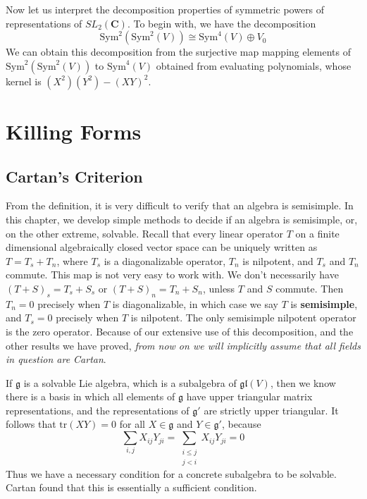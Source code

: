 Now let us interpret the decomposition properties of symmetric powers of representations of $SL_2(\mathbf{C})$. To begin with, we have the decomposition
%
\[ \text{Sym}^2(\text{Sym}^2(V)) \cong \text{Sym}^4(V) \oplus V_0 \]
%
We can obtain this decomposition from the surjective map mapping elements of $\text{Sym}^2(\text{Sym}^2(V))$ to $\text{Sym}^4(V)$ obtained from evaluating polynomials, whose kernel is $(X^2)(Y^2) - (XY)^2$.


\chapter{Killing Forms}

\section{Cartan's Criterion}

From the definition, it is very difficult to verify that an algebra is semisimple. In this chapter, we develop simple methods to decide if an algebra is semisimple, or, on the other extreme, solvable. Recall that every linear operator $T$ on a finite dimensional algebraically closed vector space can be uniquely written as $T = T_s + T_n$, where $T_s$ is a diagonalizable operator, $T_n$ is nilpotent, and $T_s$ and $T_n$ commute. This map is not very easy to work with. We don't necessarily have $(T + S)_s = T_s + S_s$ or $(T + S)_n = T_n + S_n$, unless $T$ and $S$ commute. Then $T_n = 0$ precisely when $T$ is diagonalizable, in which case we say $T$ is {\bf semisimple}, and $T_s = 0$ precisely when $T$ is nilpotent. The only semisimple nilpotent operator is the zero operator. Because of our extensive use of this decomposition, and the other results we have proved, {\it from now on we will implicitly assume that all fields in question are Cartan}.

If $\mathfrak{g}$ is a solvable Lie algebra, which is a subalgebra of $\mathfrak{gl}(V)$, then we know there is a basis in which all elements of $\mathfrak{g}$ have upper triangular matrix representations, and the representations of $\mathfrak{g}'$ are strictly upper triangular. It follows that $\text{tr}(XY) = 0$ for all $X \in \mathfrak{g}$ and $Y \in \mathfrak{g}'$, because
%
\[ \sum_{i,j} X_{ij}Y_{ji} = \sum_{\substack{i \leq j\\j < i}} X_{ij} Y_{ji} = 0 \]
%
Thus we have a necessary condition for a concrete subalgebra to be solvable. Cartan found that this is essentially a sufficient condition.

